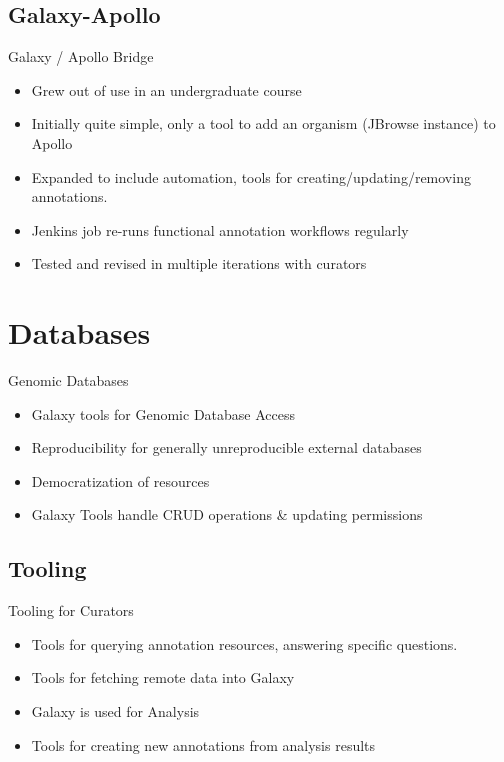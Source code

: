 \documentclass[12pt]{phage3slides} %
\begin{document}
\subsection{Galaxy-Apollo}
\begin{frame}{Galaxy / Apollo Bridge}
    \begin{itemize}
        \item Grew out of use in an undergraduate course
        \item Initially quite simple, only a tool to add an organism (JBrowse instance) to Apollo
        \item Expanded to include automation, tools for creating/updating/removing annotations.
        \item Jenkins job re-runs functional annotation workflows regularly
        \item Tested and revised in multiple iterations with curators
    \end{itemize}
\end{frame}



\section{Databases}

\begin{frame}{Genomic Databases}
    \begin{itemize}
        \item Galaxy tools for Genomic Database Access
        \item Reproducibility for generally unreproducible external databases
        \item Democratization of resources%
        \item Galaxy Tools handle CRUD operations \& updating permissions
    \end{itemize}
\end{frame}

\subsection{Tooling}
\begin{frame}{Tooling for Curators}
    \begin{itemize}
        \item Tools for querying annotation resources, answering specific questions.
        \item Tools for fetching remote data into Galaxy
        \item Galaxy is used for Analysis
        \item Tools for creating new annotations from analysis results
    \end{itemize}
\end{frame}
\end{document}
